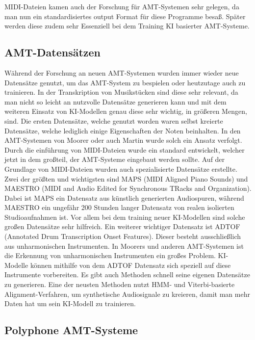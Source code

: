 \begin{description}[style=nextline]
MIDI-Dateien kamen auch der Forschung für AMT-Systemen sehr gelegen,
da man nun ein standardisiertes output Format für diese Programme besaß.
Später werden diese zudem sehr Essenziell bei dem Training KI basierter AMT-Systeme.
\cite{telila2025cnn}
\end{description}

\subsection{AMT-Datensätzen}
Während der Forschung an neuen AMT-Systemen wurden immer wieder neue Datensätze genutzt,
um das AMT-System zu bespielen oder heutzutage auch zu trainieren.
In der Transkription von Musikstücken sind diese sehr relevant,
da man nicht so leicht an nutzvolle Datensätze generieren kann und
mit dem weiteren Einsatz von KI-Modellen genau diese sehr wichtig, in größeren Mengen, sind.
Die ersten Datensätze, welche genutzt worden waren selbst kreierte Datensätze,
welche lediglich einige Eigenschaften der Noten beinhalten.
In den AMT-Systemen von Moorer\cite{Moorer1977} oder auch Martin\cite{Martin1996} wurde solch ein Ansatz verfolgt.
Durch die einführung von MIDI-Dateien wurde ein standard entwickelt,
welcher jetzt in dem großteil, der AMT-Systeme eingebaut werden sollte.
Auf der Grundlage von MIDI-Dateien wurden auch spezialisierte Datensätze erstellte.
Zwei der größten und wichtigsten sind MAPS (MIDI Aligned Piano Sounds) und
MAESTRO (MIDI and Audio Edited for Synchronous TRacks and Organization).
Dabei ist MAPS ein Datensatz aus künstlich generierten Audiospuren,
während MAESTRO ein ungefähr 200 Stunden langer Datensatz von realen isolierten Studioaufnahmen ist.
Vor allem bei dem training neuer KI-Modellen sind solche großen Datensätze sehr hilfreich.
Ein weiterer wichtiger Datensatz ist ADTOF (Annotated Drum Transcription Onset Features).
Dieser besteht ausschließlich aus unharmonischen Instrumenten.
In Moorers und anderen AMT-Systemen ist die Erkennung von unharmonischen Instrumenten ein großes Problem.
KI-Modelle können mithilfe von dem ADTOF Datensatz sich speziell auf diese Instrumente vorbereiten.
Es gibt auch Methoden schnell seine eigenen Datensätze zu generieren.
Eine der neusten Methoden nutzt HMM- und Viterbi-basierte Alignment-Verfahren,
um synthetische Audiosignale zu kreieren, damit man mehr Daten hat um sein KI-Modell zu trainieren.
\cite{joysingh2019development}

\subsection{Polyphone AMT-Systeme}
